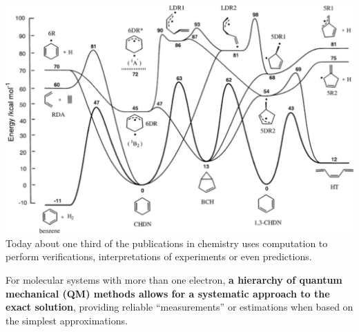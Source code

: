 \documentclass[portrait,kjemiDim,fontscale=0.292]{baposter}
\begin{document}
\begin{poster}
{  \includegraphics[scale=0.25]{DFT_reactionPathways.pdf} \\

Today about one third of the publications in chemistry uses computation to perform verifications, interpretations of experiments or even predictions.

For molecular systems with more than one electron, \textbf{a hierarchy of quantum mechanical (QM) methods allows for a systematic approach to the exact solution}, providing reliable ``measurements'' or estimations when based on the simplest approximations.


}%



\end{poster}
\end{document}
